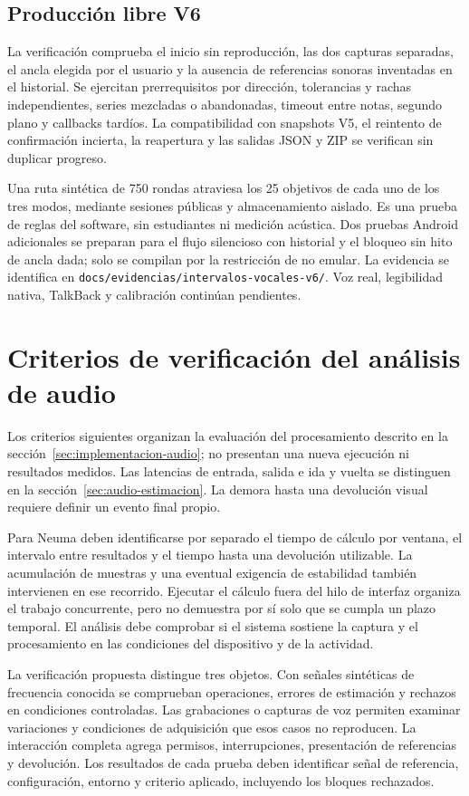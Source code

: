 \subsection{Producción libre V6}
La verificación comprueba el inicio sin reproducción, las dos capturas separadas,
el ancla elegida por el usuario y la ausencia de referencias sonoras inventadas
en el historial. Se ejercitan prerrequisitos por dirección, tolerancias y rachas
independientes, series mezcladas o abandonadas, timeout entre notas, segundo
plano y callbacks tardíos. La compatibilidad con snapshots V5, el reintento de
confirmación incierta, la reapertura y las salidas JSON y ZIP se verifican sin
duplicar progreso.

Una ruta sintética de 750 rondas atraviesa los 25 objetivos de cada uno de los
tres modos, mediante sesiones públicas y almacenamiento aislado. Es una prueba
de reglas del software, sin estudiantes ni medición acústica. Dos pruebas
Android adicionales se preparan para el flujo silencioso con historial y el
bloqueo sin hito de ancla dada; solo se compilan por la restricción de no emular.
La evidencia se identifica en \texttt{docs/evidencias/intervalos-vocales-v6/}.
Voz real, legibilidad nativa, TalkBack y calibración continúan pendientes.


\section{Criterios de verificación del análisis de audio}
\label{sec:verificacion-audio}
\label{sec:latencia-verificacion-audio}
Los criterios siguientes organizan la evaluación del procesamiento descrito en
la sección~\ref{sec:implementacion-audio}; no presentan una nueva ejecución ni
resultados medidos. Las latencias de entrada, salida e ida y vuelta se distinguen
en la sección~\ref{sec:audio-estimacion}. La demora hasta una devolución visual
requiere definir un evento final propio.

Para Neuma deben identificarse por separado el tiempo de cálculo por ventana,
el intervalo entre resultados y el tiempo hasta una devolución utilizable. La
acumulación de muestras y una eventual exigencia de estabilidad también intervienen
en ese recorrido. Ejecutar el cálculo fuera del hilo de interfaz organiza el
trabajo concurrente, pero no demuestra por sí solo que se cumpla un plazo temporal.
El análisis debe comprobar si el sistema sostiene la captura y el procesamiento
en las condiciones del dispositivo y de la actividad.

La verificación propuesta distingue tres objetos. Con señales sintéticas de
frecuencia conocida se comprueban operaciones, errores de estimación y rechazos
en condiciones controladas. Las grabaciones o capturas de voz permiten examinar
variaciones y condiciones de adquisición que esos casos no reproducen. La
interacción completa agrega permisos, interrupciones, presentación de referencias
y devolución. Los resultados de cada prueba deben identificar señal de referencia,
configuración, entorno y criterio aplicado, incluyendo los bloques rechazados.

